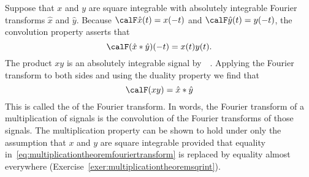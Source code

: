 Suppose that $x$ and $y$ are square integrable with absolutely integrable Fourier transforms $\hat{x}$ and $\hat{y}$.  Because $\calF \hat{x}(t) = x(-t)$ and $\calF \hat{y}(t) = y(-t)$, the convolution property asserts that
\[
\calF(\hat{x} * \hat{y})(-t) = x(t)y(t).
\]
The product $x y$ is an absolutely integrable signal by~~\cite[Theorem~3.5]{Rudin_real_and_complex_analysis}.  Applying the Fourier transform to both sides and using the duality property we find that
\begin{equation}\label{eq:multiplicationtheoremfouriertransform}
\calF(x y) = \hat{x} * \hat{y}
\end{equation}
This is called the  of the Fourier transform.  In words, the Fourier transform of a multiplication of signals is the convolution of the Fourier transforms of those signals.  The multiplication property can be shown to hold under only the assumption that $x$ and $y$ are square integrable 
provided that equality in~\eqref{eq:multiplicationtheoremfouriertransform} is replaced by equality almost everywhere (Exercise~\ref{exer:multiplicationtheoremsqrint}).




